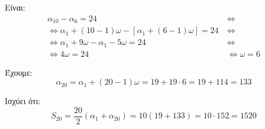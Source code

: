 
\begin{alist}
\item Είναι:
\begin{align*}
\alpha_{10} - \alpha_6 = 24 \ &\Leftrightarrow \\
\Leftrightarrow \alpha_1 + (10 - 1)\omega - [\alpha_1 + (6 - 1)\omega] = 24 \ &\Leftrightarrow \\
\Leftrightarrow \alpha_1 + 9\omega - \alpha_1 - 5\omega = 24 \ &\Leftrightarrow \\
\Leftrightarrow 4\omega = 24 &\Leftrightarrow \omega = 6
\end{align*}

\item Έχουμε:
\[\alpha_{20} = \alpha_1 + (20 - 1)\omega = 19 + 19 \cdot 6 = 19 + 114 = 133\]

\item Ισχύει ότι:
\[S_{20} = \dfrac{20}{2}(\alpha_1 + \alpha_{20}) = 10(19 + 133) = 10 \cdot 152 = 1520\]
\end{alist}

